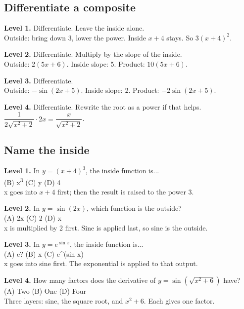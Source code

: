 \documentclass[11pt]{article}
\begin{document}
\subsection*{Differentiate a composite}
\noindent\textbf{Level 1.} Differentiate. Leave the inside alone.\\  \quad Outside: bring down 3, lower the power. Inside $x+4$ stays. So $3(x+4)^{2}$.\par\medskip
\noindent\textbf{Level 2.} Differentiate. Multiply by the slope of the inside.\\  \quad Outside: $2(5x+6)$. Inside slope: 5. Product: $10(5x+6)$.\par\medskip
\noindent\textbf{Level 3.} Differentiate.\\  \quad Outside: $-\sin(2x+5)$. Inside slope: 2. Product: $-2\sin(2x+5)$.\par\medskip
\noindent\textbf{Level 4.} Differentiate. Rewrite the root as a power if that helps.\\  \quad $\dfrac{1}{2\sqrt{x^{2}+2}}\cdot 2x=\dfrac{x}{\sqrt{x^{2}+2}}$.\par\medskip
\subsection*{Name the inside}
\noindent\textbf{Level 1.} In $y=(x+4)^{3}$, the inside function is...\\  \quad (B) x\textsuperscript{3} \quad (C) y \quad (D) 4\\  \quad x goes into $x+4$ first; then the result is raised to the power 3.\par\medskip
\noindent\textbf{Level 2.} In $y=\sin(2x)$, which function is the outside?\\ (A) 2x \quad {} \quad (C) 2 \quad (D) x\\  \quad x is multiplied by 2 first. Sine is applied last, so sine is the outside.\par\medskip
\noindent\textbf{Level 3.} In $y=e^{\sin x}$, the inside function is...\\ (A) e? \quad (B) x \quad (C) e\textasciicircum{}(sin x) \quad {}\\  \quad x goes into sine first. The exponential is applied to that output.\par\medskip
\noindent\textbf{Level 4.} How many factors does the derivative of $y=\sin\left(\sqrt{x^{2}+6}\right)$ have?\\ (A) Two \quad (B) One \quad {} \quad (D) Four\\  \quad Three layers: sine, the square root, and $x^{2}+6$. Each gives one factor.\par\medskip
\end{document}
